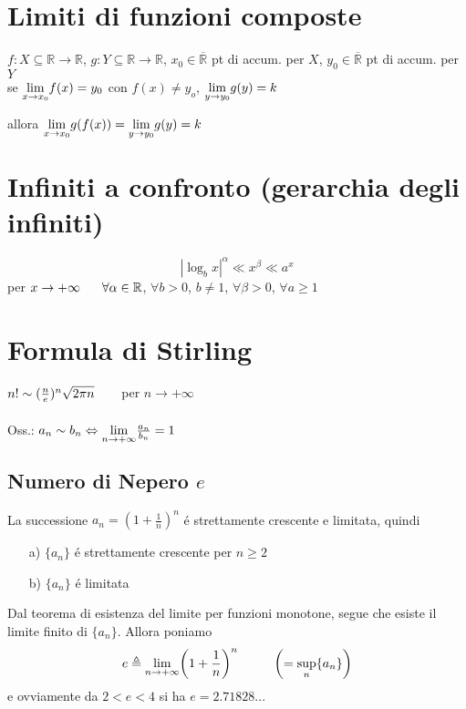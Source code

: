 \section{Limiti di funzioni composte}
$f: X \subseteq \mathbb{R} \to \mathbb{R}$, $g: Y \subseteq \mathbb{R} \to \mathbb{R}$, $x_0 \in \overline{\mathbb{R}}$ pt di accum. per $X$, $y_0 \in \overline{\mathbb{R}}$ pt di accum. per $Y$ \\
se $\smash{\displaystyle\lim_{x \to x_0}} f(x)=y_0$ con $f(x) \not=y_o$, $\smash{\displaystyle\lim_{y \to y_0}} g(y)=k$\\
\\
allora $\smash{\displaystyle\lim_{x \to x_0}} g(f(x))= \smash{\displaystyle\lim_{y \to y_0}} g(y)=k$
\section{Infiniti a confronto (gerarchia degli infiniti)}
$$|\log_b x|^{\alpha} \ll x^{\beta} \ll a^{x}$$ per $x \to +\infty \hspace{0.6cm} \forall \alpha \in \mathbb{R}$, $\forall b>0$, $b \not=1$, $\forall \beta >0$, $\forall a \ge 1$
\section{Formula di Stirling}
$n! \sim (\frac{n}{e})^{n}\sqrt{2\pi n} \hspace{.6cm}$ per $n \to +\infty$ \\
\\
Oss.: $a_n \sim b_n \Leftrightarrow \smash{\displaystyle\lim_{n \to +\infty}} \frac{a_n}{b_n} = 1$
\subsection{Numero di Nepero $e$ }
La successione $a_n=(1+ \frac{1}{n})^{n}$ \'e strettamente crescente e limitata, quindi \\
\begin{itemize}
\item[a)] $\{a_n\}$ \'e strettamente crescente per $n \ge 2$
\item[b)] $\{a_n\}$ \'e limitata
\end{itemize}
Dal teorema di esistenza del limite per funzioni monotone, segue che esiste il limite finito di $\{a_n\}$. Allora poniamo $$e \triangleq \smash{\displaystyle\lim_{n \to +\infty}} \biggl(1+\frac{1}{n}\biggl)^n \hspace{1cm} \biggl(=\smash{\displaystyle\sup_{n}} \{a_n\}\biggl)$$ e ovviamente da $2<e<4$ si ha $e=2.71828...$
